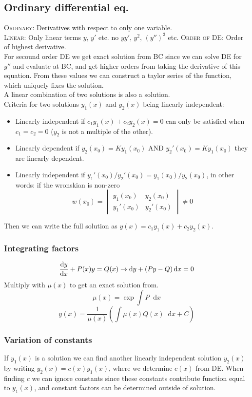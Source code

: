 \documentclass[a4paper, 10pt]{article}
\newcommand*\diff{\mathop{}\!\mathrm{d}}
\begin{document}
\begin{multicols*}{3}
\begin{mdframed}
\subsection*{Ordinary differential eq.}
\end{mdframed}
\textsc{Ordinary:} Derivatives with respect to only one variable.\\
\textsc{Linear:} Only linear terms $y$, $y'$ etc. no $yy'$, $y^2$, $(y'')^3$ etc.
\textsc{Order of DE:} Order of highest derivative.\\
For secound order DE we get exact solution from BC since we can solve DE for $y''$ and evaluate at BC, and get higher orders from taking the derivative of this equation. From these values we can construct a taylor series of the function, which uniquely fixes the solution.\\
A linear combination of two solutions is also a solution.\\
Criteria for two solutions $y_1(x)$ and $y_2(x)$ being linearly independent:
\begin{itemize}
  \item Linearly independent if $c_1y_1(x) + c_2y_2(x) = 0$ can only be satisfied when $c_1 = c_2=0$ ($y_2$ is not a multiple of the other).
  \item Linearly dependent if $y_2(x_0) = Ky_1(x_0)$ AND $y_2'(x_0) = Ky_1(x_0)$ they are linearly dependent.
  \item Linearly independent if $y_1'(x_0)/y_2'(x_0) = y_1(x_0)/y_2(x_0)$, in other words: if the wronskian is non-zero $$ w(x_0) = \begin{vmatrix}
  y_1(x_0)  & y_2(x_0)\\
  y_1'(x_0) & y_2'(x_0)
  \end{vmatrix} \neq 0$$
\end{itemize}
Then we can write the full solution as $y(x)=c_1y_1(x) + c_2y_2(x)$.
\subsubsection*{\small Integrating factors}
$$\dv{y}{x} + P(x)y = Q(x) \rightarrow \diff y + \left(Py-Q\right)\diff x = 0$$
Multiply with $\mu(x)$ to get an exact solution from.
$$ \mu(x) = \exp{\int P \diff x}$$
$$ y(x) = \frac{1}{\mu(x)}\left( \int \mu(x)Q(x)\diff x +C\right)$$
\subsubsection*{\small Variation of constants}
If $y_1(x)$ is a solution we can find another linearly independent solution $y_2(x)$ by writing $y_2(x) = c(x)y_1(x)$, where we determine $c(x)$ from DE. When finding $c$ we can ignore constants since these constants contribute function equal to $y_1(x)$, and constant factors can be determined outside of solution.

\end{multicols*}
\end{document}
